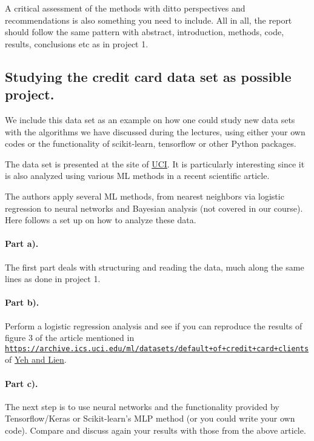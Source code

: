 \documentclass[%
oneside,                 %
final,                   %
10pt]{article}
\begin{document}
A critical assessment of the methods with
ditto perspectives and recommendations is also something you need to
include.  All in all, the report should follow the same pattern with
abstract, introduction, methods, code, results, conclusions etc as in project 1.

\subsection*{Studying the credit card data set as possible project.}

We include this data set as an example on how one could study new data
sets with the algorithms we have discussed during the lectures, using
either your own codes or the functionality of scikit-learn, tensorflow
or other Python packages.

The data set is presented at the site of \href{{https://archive.ics.uci.edu/ml/index.php}}{UCI}. It is particularly
interesting since it is also analyzed using various ML methods in a recent
scientific article.

The authors apply several ML methods, from nearest neighbors via
logistic regression to neural networks and Bayesian analysis (not
covered in our course). Here follows a set up on how to analyze
these data.

\paragraph{Part a).}
The first part deals with structuring and reading the data, much along the same lines as done in project 1.

\paragraph{Part b).}
Perform a logistic regression analysis and see if you can reproduce
the results of figure 3 of the article mentioned in
\href{{https://archive.ics.uci.edu/ml/datasets/default+of+credit+card+clients}}{\nolinkurl{https://archive.ics.uci.edu/ml/datasets/default+of+credit+card+clients}} of \href{{https://www.sciencedirect.com/science/article/abs/pii/S0957417407006719}}{Yeh and Lien}.

\paragraph{Part c).}
The next step is to use neural networks and the functionality provided
by Tensorflow/Keras or Scikit-learn's MLP method (or you could write
your own code). Compare and discuss again your results with those from
the above article.
\end{document}
